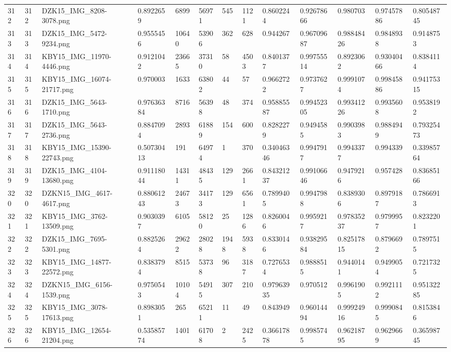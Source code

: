 \documentclass[11pt, a4paper, twoside]{report}
\begin{document}
\begin{longtable}[c]{@{}lllllllllllll@{}}
312 & 312 & DZK15\_IMG\_8208-3078.png & 0.8922659 & 6899 & 56971 & 545 & 1121 & 0.8602244 & 0.92678666 & 0.980703 & 0.97457886 & 0.80548745 \\
313 & 313 & DZK15\_IMG\_5472-9234.png & 0.9555456 & 10640 & 53906 & 362 & 628 & 0.944267 & 0.96709687 & 0.98848426 & 0.9848938 & 0.9148753 \\
314 & 314 & KBY15\_IMG\_11970-4446.png & 0.9121042 & 23665 & 37310 & 58 & 4503 & 0.8401377 & 0.99755514 & 0.8923062 & 0.93040466 & 0.8384114 \\
315 & 315 & KBY15\_IMG\_16074-21717.png & 0.970003 & 1633 & 63802 & 44 & 57 & 0.9662722 & 0.9737627 & 0.9991074 & 0.99845886 & 0.94175315 \\
316 & 316 & DZK15\_IMG\_5643-1710.png & 0.97636384 & 8716 & 56398 & 48 & 374 & 0.95885587 & 0.99452305 & 0.99341226 & 0.9935608 & 0.9538192 \\
317 & 317 & DZK15\_IMG\_5643-2736.png & 0.8847094 & 2893 & 61889 & 154 & 600 & 0.8282279 & 0.9494585 & 0.9903983 & 0.9884949 & 0.79325473 \\
318 & 318 & KBY15\_IMG\_15390-22743.png & 0.50730413 & 191 & 64974 & 1 & 370 & 0.34046346 & 0.9947917 & 0.9943377 & 0.994339 & 0.33985764 \\
319 & 319 & DZK15\_IMG\_4104-13680.png & 0.91118044 & 14311 & 48435 & 129 & 2661 & 0.84321237 & 0.99106646 & 0.9479216 & 0.957428 & 0.83685166 \\
320 & 320 & DZKN15\_IMG\_4617-4617.png & 0.88061243 & 24673 & 34173 & 129 & 6561 & 0.7899405 & 0.9947988 & 0.8389306 & 0.8979187 & 0.7866913 \\
321 & 321 & KBY15\_IMG\_3762-13509.png & 0.9030397 & 6105 & 58120 & 25 & 1286 & 0.8260046 & 0.9959217 & 0.97835237 & 0.9799957 & 0.8232201 \\
322 & 322 & DZK15\_IMG\_7695-5301.png & 0.8825264 & 29622 & 28028 & 1948 & 5938 & 0.8330146 & 0.93829584 & 0.82517815 & 0.8796692 & 0.7897515 \\
323 & 323 & KBY15\_IMG\_14877-22572.png & 0.8383794 & 8515 & 53738 & 96 & 3187 & 0.7276534 & 0.9888515 & 0.9440141 & 0.9499054 & 0.7217325 \\
324 & 324 & DZKN15\_IMG\_6156-1539.png & 0.9750543 & 10104 & 54915 & 307 & 210 & 0.97963935 & 0.970512 & 0.9961905 & 0.9921112 & 0.95132285 \\
325 & 325 & KBY15\_IMG\_3078-17613.png & 0.8983051 & 265 & 65211 & 11 & 49 & 0.843949 & 0.96014494 & 0.99924916 & 0.9990845 & 0.8153846 \\
326 & 326 & KBY15\_IMG\_12654-21204.png & 0.53585774 & 1401 & 61708 & 2 & 2425 & 0.36617878 & 0.9985745 & 0.96218795 & 0.9629669 & 0.36598745 \\

\end{longtable}
\end{document}
